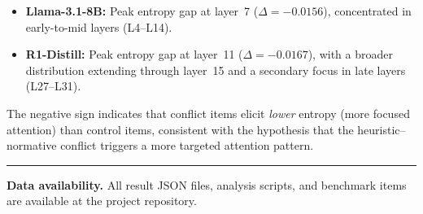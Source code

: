 \documentclass[accepted]{article}
\begin{document}
\begin{itemize}[leftmargin=*,itemsep=2pt]
  \item \textbf{Llama-3.1-8B:} Peak entropy gap at layer~7
  ($\Delta = -0.0156$), concentrated in early-to-mid layers
  (L4--L14).
  \item \textbf{R1-Distill:} Peak entropy gap at layer~11
  ($\Delta = -0.0167$), with a broader distribution extending
  through layer~15 and a secondary focus in late layers (L27--L31).
\end{itemize}

\noindent The negative sign indicates that conflict items elicit
\emph{lower} entropy (more focused attention) than control items,
consistent with the hypothesis that the heuristic--normative conflict
triggers a more targeted attention pattern.

\vspace{1em}
\hrule
\vspace{0.5em}
\noindent\small\textbf{Data availability.}  All result JSON files,
analysis scripts, and benchmark items are available at the project
repository.




\end{document}
